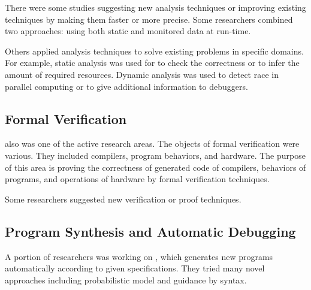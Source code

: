 There were some studies suggesting new analysis techniques or improving
existing techniques by making them faster or more precise. Some researchers
combined two approaches: using both static and monitored data at run-time.

Others applied analysis techniques to solve existing problems in specific
domains. For example, static analysis was used for  to
check the correctness or to infer the amount of required resources. Dynamic
analysis was used to detect race in parallel computing or to give additional
information to debuggers.

\subsection{Formal Verification}

 also was one of the active research areas. The objects of formal verification were
various. They included compilers, program behaviors, and hardware. The purpose
of this area is proving the correctness of generated code of compilers,
behaviors of programs, and operations of hardware by formal verification techniques.

Some researchers suggested new verification or proof techniques.

\subsection{Program Synthesis and Automatic Debugging}

A portion of researchers was working on , which generates
new programs automatically according to given specifications. They tried many
novel approaches including probabilistic model and guidance by syntax.
